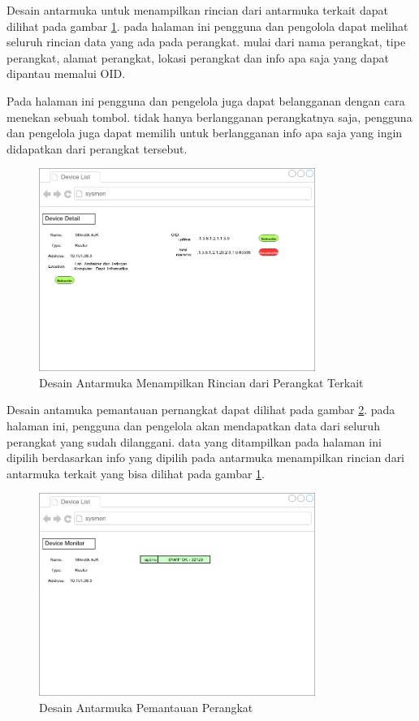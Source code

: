         	Desain antarmuka untuk menampilkan rincian dari antarmuka terkait dapat dilihat pada gambar \ref{desain:antarmuka2}. pada halaman ini pengguna dan pengolola dapat melihat seluruh rincian data yang ada pada perangkat. mulai dari nama perangkat, tipe perangkat, alamat perangkat, lokasi perangkat dan info apa saja yang dapat dipantau memalui OID.
        	
        	Pada halaman ini pengguna dan pengelola juga dapat belangganan dengan cara menekan sebuah tombol. tidak hanya berlangganan perangkatnya saja, pengguna dan pengelola juga dapat memilih untuk berlangganan info apa saja yang ingin didapatkan dari perangkat tersebut.
	        \begin{figure}[H]
	        	\centering
	        	\includegraphics[width=9cm]{Images/C-3/antarmuka2.png}
	        	\caption{Desain Antarmuka Menampilkan Rincian dari Perangkat Terkait}
	        	\label{desain:antarmuka2}
	        \end{figure}
        
        	Desain antamuka pemantauan pernangkat dapat dilihat pada gambar \ref{desain:antarmuka3}. pada halaman ini, pengguna dan pengelola akan mendapatkan data dari seluruh perangkat yang sudah dilanggani. data yang ditampilkan pada halaman ini dipilih berdasarkan info yang dipilih pada antarmuka menampilkan rincian dari antarmuka terkait yang bisa dilihat pada gambar \ref{desain:antarmuka2}.
		    \begin{figure}[H]
		    	\centering
		    	\includegraphics[width=9cm]{Images/C-3/antarmuka3.png}
		    	\caption{Desain Antarmuka Pemantauan Perangkat}
		    	\label{desain:antarmuka3}
		    \end{figure}
